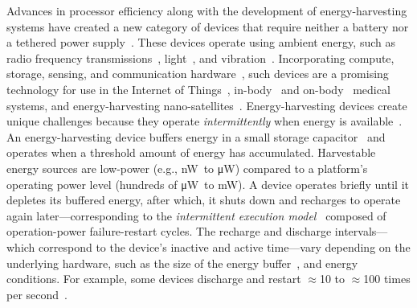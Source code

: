 Advances in processor efficiency along with the development of energy-harvesting systems have created a new category of devices that require neither a battery nor a tethered power supply~\cite{prasad_comst_2014,lucia_snapl_2017,soyata_csm_2016}. These devices operate using ambient energy, such as radio frequency transmissions~\cite{rf_powered_computing_gollakota_2014},
light~\cite{margolies_infocom_2016,margolies_tosn_2016}, and vibration~\cite{gorlatova_sigmetrics_2014}. Incorporating compute, storage, sensing, and communication hardware~\cite{wisp5,moo,capybara}, such devices are a promising technology for use in the Internet of Things~\cite{ku_cst_2016}, in-body~\cite{nadeau_naturebio_2017} and on-body~\cite{bandodkar_electroanalysis_2015} medical systems, and energy-harvesting nano-satellites~\cite{kicksat,capybara}. Energy-harvesting devices create unique challenges because they operate {\em intermittently} when energy is available~\cite{hicks_isca_2017,lucia_snapl_2017}. An energy-harvesting device buffers energy in a small storage capacitor~\cite{gorlatova_tmc_2013,gunduz_commag_2014} and operates when a threshold amount of energy has accumulated. Harvestable energy sources are low-power (e.g., \si{\nano\watt}\ to \si{\micro\watt}) compared to a platform's operating power level (hundreds of \si{\micro\watt}\ to \si{\milli\watt}). A device operates briefly until it depletes its buffered energy, after which, it shuts down and recharges to operate again later---corresponding to the {\em intermittent execution model}~\cite{dino,lucia_snapl_2017} composed of operation-power failure-restart cycles. The recharge and discharge intervals---which correspond to the device's inactive and active time---vary depending on the underlying hardware, such as the size of the energy buffer~\cite{capybara}, and energy conditions. For example, some devices discharge and restart $\approx$10 to $\approx$100 times per second~\cite{tan_infocom_2016,mementos,nvp}.

